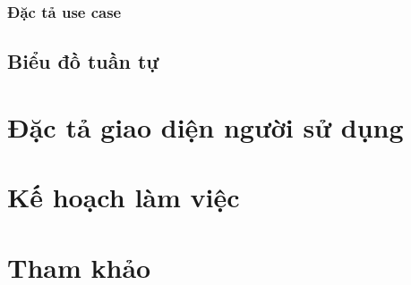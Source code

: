 \documentclass[a4paper, 12pt]{article}
\begin{document}
    \subsubsection{Đặc tả use case}


    \subsection{Biểu đồ tuần tự}
    \clearpage

    \section{Đặc tả giao diện người sử dụng}
    \label{sec:describeUI}
    \clearpage

    \section{Kế hoạch làm việc}
    \label{sec:plan}
    \clearpage

    \section{Tham khảo}
    \label{sec:reference}
    \clearpage
\end{document}
